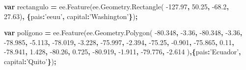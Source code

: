 \documentclass[
]{article}
\newenvironment{Shaded}{\begin{snugshade}}{\end{snugshade}}
\newcommand{\AttributeTok}[1]{\textcolor[rgb]{0.77,0.63,0.00}{#1}}
\newcommand{\DataTypeTok}[1]{\textcolor[rgb]{0.13,0.29,0.53}{#1}}
\newcommand{\FloatTok}[1]{\textcolor[rgb]{0.00,0.00,0.81}{#1}}
\newcommand{\KeywordTok}[1]{\textcolor[rgb]{0.13,0.29,0.53}{\textbf{#1}}}
\newcommand{\NormalTok}[1]{#1}
\newcommand{\OperatorTok}[1]{\textcolor[rgb]{0.81,0.36,0.00}{\textbf{#1}}}
\newcommand{\StringTok}[1]{\textcolor[rgb]{0.31,0.60,0.02}{#1}}
\newcommand{\VariableTok}[1]{\textcolor[rgb]{0.00,0.00,0.00}{#1}}
\begin{document}
\begin{Shaded}
\begin{Highlighting}[]
\KeywordTok{var}\NormalTok{ rectangulo }\OperatorTok{=} \VariableTok{ee}\NormalTok{.}\AttributeTok{Feature}\NormalTok{(}\VariableTok{ee}\NormalTok{.}\VariableTok{Geometry}\NormalTok{.}\AttributeTok{Rectangle}\NormalTok{(}
  \FloatTok{-127.97}\OperatorTok{,} \FloatTok{50.25}\OperatorTok{,}
  \FloatTok{-68.2}\OperatorTok{,} \FloatTok{27.63}\NormalTok{)}\OperatorTok{,}
    \OperatorTok{\{}\DataTypeTok{pais}\OperatorTok{:}\StringTok{'eeuu'}\OperatorTok{,} \DataTypeTok{capital}\OperatorTok{:}\StringTok{'Washington'}\OperatorTok{\}}\NormalTok{)}\OperatorTok{;} 

\KeywordTok{var}\NormalTok{ polígono }\OperatorTok{=} \VariableTok{ee}\NormalTok{.}\AttributeTok{Feature}\NormalTok{(}\VariableTok{ee}\NormalTok{.}\VariableTok{Geometry}\NormalTok{.}\AttributeTok{Polygon}\NormalTok{(  }
  \FloatTok{-80.348}\OperatorTok{,} \FloatTok{-3.36}\OperatorTok{,}
  \FloatTok{-80.348}\OperatorTok{,} \FloatTok{-3.36}\OperatorTok{,}
  \FloatTok{-78.985}\OperatorTok{,} \FloatTok{-5.113}\OperatorTok{,}
  \FloatTok{-78.019}\OperatorTok{,} \FloatTok{-3.228}\OperatorTok{,}
  \FloatTok{-75.997}\OperatorTok{,} \FloatTok{-2.394}\OperatorTok{,}
  \FloatTok{-75.25}\OperatorTok{,} \FloatTok{-0.901}\OperatorTok{,}
  \FloatTok{-75.865}\OperatorTok{,} \FloatTok{0.11}\OperatorTok{,}
  \FloatTok{-78.941}\OperatorTok{,} \FloatTok{1.428}\OperatorTok{,}
  \FloatTok{-80.26}\OperatorTok{,} \FloatTok{0.725}\OperatorTok{,}
  \FloatTok{-80.919}\OperatorTok{,} \FloatTok{-1.911}\OperatorTok{,}
  \FloatTok{-79.776}\OperatorTok{,} \FloatTok{-2.614}
\NormalTok{  )}\OperatorTok{,\{}\DataTypeTok{pais}\OperatorTok{:}\StringTok{'Ecuador'}\OperatorTok{,} \DataTypeTok{capital}\OperatorTok{:}\StringTok{'Quito'}\OperatorTok{\}}\NormalTok{)}\OperatorTok{;}


\end{Highlighting}
\end{Shaded}
\end{document}
